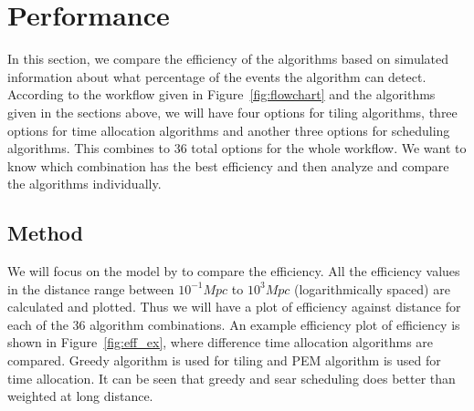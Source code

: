 \documentclass[twocolumn]{aastex61}
\begin{document}
\section{Performance}
\label{sec:performance}
In this section, we compare the efficiency of the algorithms based on simulated information about what percentage of the events the algorithm can detect. According to the workflow given in Figure~\ref{fig:flowchart} and the algorithms given in the sections above, we will have four options for tiling algorithms, three options for time allocation algorithms and another three options for scheduling algorithms. This combines to 36 total options for the whole workflow. We want to know which combination has the best efficiency and then analyze and compare the algorithms individually.
\subsection{Method}
We will focus on the model by \cite{Me2017} to compare the efficiency. All the efficiency values in the distance range between $10^{-1} Mpc$ to $10^3 Mpc$ (logarithmically spaced) are calculated and plotted. Thus we will have a plot of efficiency against distance for each of the 36 algorithm combinations. An example efficiency plot of efficiency is shown in Figure~\ref{fig:eff_ex}, where difference time allocation algorithms are compared. Greedy algorithm is used for tiling and PEM algorithm is used for time allocation. It can be seen that greedy and sear scheduling does better than weighted at long distance. 
\end{document}
